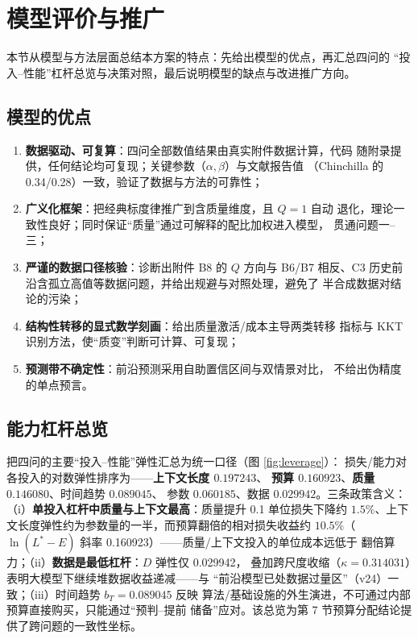 \section{模型评价与推广}

本节从模型与方法层面总结本方案的特点：先给出模型的优点，再汇总四问的
``投入--性能''杠杆总览与决策对照，最后说明模型的缺点与改进推广方向。

\subsection{模型的优点}

\begin{enumerate}
\item \textbf{数据驱动、可复算}：四问全部数值结果由真实附件数据计算，代码
随附录提供，任何结论均可复现；关键参数（$\alpha,\beta$）与文献报告值
（Chinchilla 的 0.34/0.28）一致，验证了数据与方法的可靠性；
\item \textbf{广义化框架}：把经典标度律推广到含质量维度，且 $Q=1$ 自动
退化，理论一致性良好；同时保证``质量''通过可解释的配比加权进入模型，
贯通问题一--三；
\item \textbf{严谨的数据口径核验}：诊断出附件 B8 的 $Q$ 方向与 B6/B7
相反、C3 历史前沿含孤立高值等数据问题，并给出规避与对照处理，避免了
半合成数据对结论的污染；
\item \textbf{结构性转移的显式数学刻画}：给出质量激活/成本主导两类转移
指标与 KKT 识别方法，使``质变''判断可计算、可复现；
\item \textbf{预测带不确定性}：前沿预测采用自助置信区间与双情景对比，
不给出伪精度的单点预言。
\end{enumerate}

\subsection{能力杠杆总览}

把四问的主要``投入--性能''弹性汇总为统一口径（图 \ref{fig:leverage}）：
损失/能力对各投入的对数弹性排序为——\textbf{上下文长度 $0.197243$}、
\textbf{预算 $0.160923$}、\textbf{质量 $0.146080$}、时间趋势 $0.089045$、
参数 $0.060185$、数据 $0.029942$。三条政策含义：
（i）\textbf{单投入杠杆中质量与上下文最高}：质量提升 0.1 单位损失下降约
$1.5\%$、上下文长度弹性约为参数量的一半，而预算翻倍的相对损失收益约
$10.5\%$（$\ln(L^*-E)$ 斜率 0.160923）——质量/上下文投入的单位成本远低于
翻倍算力；（ii）\textbf{数据是最低杠杆}：$D$ 弹性仅 0.029942，
叠加跨尺度收缩（$\kappa=0.314031$）表明大模型下继续堆数据收益递减——与
``前沿模型已处数据过量区''（v24）一致；（iii）时间趋势 $b_T=0.089045$ 反映
算法/基础设施的外生演进，不可通过内部预算直接购买，只能通过``预判--提前
储备''应对。该总览为第 7 节预算分配结论提供了跨问题的一致性坐标。

